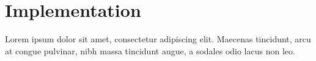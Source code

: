 \chapter{Implementation}
Lorem ipsum dolor sit amet, consectetur adipiscing elit. Maecenas tincidunt,
arcu at congue pulvinar, nibh massa tincidunt augue, a sodales odio lacus non
leo.
